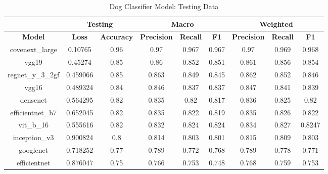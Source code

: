 \documentclass{article}
\begin{document}
\begin{table}[h]
\centering
\begin{tabular}{|c|cc|ccc|ccc|}
\hline
\multicolumn{1}{|l|}{} &
  \multicolumn{2}{c|}{Testing} &
  \multicolumn{3}{c|}{Macro} &
  \multicolumn{3}{c|}{Weighted} \\ \hline
\textbf{Model} &
  \multicolumn{1}{c|}{\textbf{Loss}} &
  \textbf{Accuracy} &
  \multicolumn{1}{c|}{\textbf{Precision}} &
  \multicolumn{1}{c|}{\textbf{Recall}} &
  \textbf{F1} &
  \multicolumn{1}{c|}{\textbf{Precision}} &
  \multicolumn{1}{c|}{\textbf{Recall}} &
  \textbf{F1} \\ \hline
covenext\_large &
  \multicolumn{1}{c|}{0.10765} &
  0.96 &
  \multicolumn{1}{c|}{0.97} &
  \multicolumn{1}{c|}{0.967} &
  0.967 &
  \multicolumn{1}{c|}{0.97} &
  \multicolumn{1}{c|}{0.969} &
  0.968 \\ \hline
vgg19 &
  \multicolumn{1}{c|}{0.45274} &
  0.85 &
  \multicolumn{1}{c|}{0.86} &
  \multicolumn{1}{c|}{0.852} &
  0.851 &
  \multicolumn{1}{c|}{0.861} &
  \multicolumn{1}{c|}{0.856} &
  0.854 \\ \hline
regnet\_y\_3\_2gf &
  \multicolumn{1}{c|}{0.459066} &
  0.85 &
  \multicolumn{1}{c|}{0.863} &
  \multicolumn{1}{c|}{0.849} &
  0.845 &
  \multicolumn{1}{c|}{0.862} &
  \multicolumn{1}{c|}{0.852} &
  0.846 \\ \hline
vgg16 &
  \multicolumn{1}{c|}{0.489324} &
  0.84 &
  \multicolumn{1}{c|}{0.846} &
  \multicolumn{1}{c|}{0.837} &
  0.837 &
  \multicolumn{1}{c|}{0.847} &
  \multicolumn{1}{c|}{0.841} &
  0.839 \\ \hline
densenet &
  \multicolumn{1}{c|}{0.564295} &
  0.82 &
  \multicolumn{1}{c|}{0.835} &
  \multicolumn{1}{c|}{0.82} &
  0.817 &
  \multicolumn{1}{c|}{0.836} &
  \multicolumn{1}{c|}{0.825} &
  0.82 \\ \hline
efficientnet\_b7 &
  \multicolumn{1}{c|}{0.652045} &
  0.82 &
  \multicolumn{1}{c|}{0.835} &
  \multicolumn{1}{c|}{0.822} &
  0.819 &
  \multicolumn{1}{c|}{0.835} &
  \multicolumn{1}{c|}{0.826} &
  0.822 \\ \hline
vit\_b\_16 &
  \multicolumn{1}{c|}{0.555616} &
  0.82 &
  \multicolumn{1}{c|}{0.832} &
  \multicolumn{1}{c|}{0.824} &
  0.824 &
  \multicolumn{1}{c|}{0.834} &
  \multicolumn{1}{c|}{0.827} &
  0.8247 \\ \hline
inception\_v3 &
  \multicolumn{1}{c|}{0.900824} &
  0.8 &
  \multicolumn{1}{c|}{0.814} &
  \multicolumn{1}{c|}{0.803} &
  0.801 &
  \multicolumn{1}{c|}{0.815} &
  \multicolumn{1}{c|}{0.809} &
  0.803 \\ \hline
googlenet &
  \multicolumn{1}{c|}{0.718252} &
  0.77 &
  \multicolumn{1}{c|}{0.789} &
  \multicolumn{1}{c|}{0.772} &
  0.768 &
  \multicolumn{1}{c|}{0.789} &
  \multicolumn{1}{c|}{0.778} &
  0.771 \\ \hline
efficientnet &
  \multicolumn{1}{c|}{0.876047} &
  0.75 &
  \multicolumn{1}{c|}{0.766} &
  \multicolumn{1}{c|}{0.753} &
  0.748 &
  \multicolumn{1}{c|}{0.768} &
  \multicolumn{1}{c|}{0.759} &
  0.753 \\ \hline
\end{tabular}
\caption{Dog Classifier Model: Testing Data}
\label{tab:model2-test-further}
\end{table}
\end{document}
